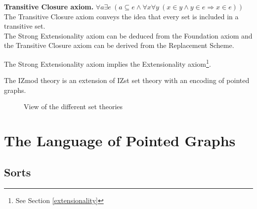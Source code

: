 \documentclass[submission,copyright,creativecommons]{eptcs}
\def\imp{\mathbin{\Rightarrow}}
\def\fa{{\forall}}
\def\conj{\mathbin{\wedge}}
\def\ex{{\exists}}
\begin{document}
\textbf{Transitive Closure axiom.} $\fa a\ex e~(a \subseteq e \conj \fa x\fa y~(x \in y \conj y \in e \imp x \in e))$ \\

The Transitive Closure axiom conveys the idea that every set is included in a transitive set. \\

The Strong Extensionality axiom can be deduced from the Foundation axiom and the Transitive Closure axiom can be derived from the Replacement Scheme.

The Strong Extensionality axiom implies the Extensionality axiom\footnote{See Section \ref{extensionality}}.

The IZmod theory is an extension of IZst set theory with an encoding of pointed graphs.

\begin{figure}[h]
\centering
{}
\caption{View of the different set theories}
\end{figure}


\section{The Language of Pointed Graphs}

\subsection{Sorts}
\end{document}
